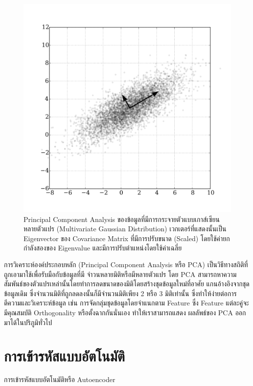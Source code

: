 \begin{figure}[H]
    \centering
    \includegraphics[width=0.8\linewidth]{fig/pca.png}
    \caption{Principal Component Analysis ของข้อมูลที่มีการกระจายตัวแบบเกาส์เซียนหลายตัวแปร (Multivariate Gaussian
    Distribution) เวกเตอร์ที่แสดงนั้นเป็น Eigenvector ของ Covariance Matrix ที่มีการปรับขนาด (Scaled) โดยใช้ค่ายกกำลังสองของ 
    Eigenvalue และมีการปรับตำแหน่งโดยใช้ค่าเฉลี่ย}
    \label{fig:pca}
\end{figure}

การวิเคราะห์องค์ประกอบหลัก (Principal Component Analysis หรือ PCA) เป็นวิธีทางสถิติที่ถูกเอามาใช้เพื่อรับมือกับข้อมูลที่มี
จำวนหลายมิติหรือมีหลายตัวแปร โดย PCA สามารถหาความสัมพันธ์ของตัวแปรเหล่านั้นโดยทำการลดขนาดของมิติโดยสร้างชุดข้อมูลใหม่ที่อาศัย
แกนอ้างอิงจากชุดข้อมูลเดิม ซึ่งจำนวนมิติที่ถูกลดลงนั้นก็มีจำนวนมิติเพียง 2 หรือ 3 มิติเท่านั้น ซึ่งทำให้ง่ายต่อการตีความและวิเคราะห์ข้อมูล เช่น
การจัดกลุ่มชุดข้อมูลโดยจำแนกตาม Feature ซึ่ง Feature แต่ละคู่จะมีคุณสมบัติ Orthogonality หรือตั้งฉากกันนั่นเอง ทำให้เราสามารถแสดง
ผลลัพธ์ของ PCA ออกมาได้ในปริภูมิทั่วไป

\section{การเข้ารหัสแบบอัตโนมัติ}

การเข้ารหัสแบบอัตโนมัติหรือ Autoencoder


